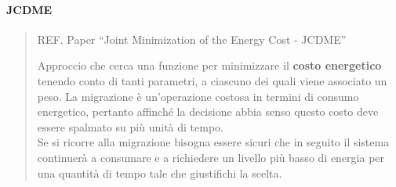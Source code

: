 \documentclass{article}
\begin{document}
		\paragraph{JCDME}
		\begin{quote}
		REF. Paper ``Joint Minimization of the Energy Cost -
		JCDME''
		
		Approccio che cerca una funzione per minimizzare il \textbf{costo energetico} tenendo conto di tanti parametri, a ciascuno dei quali viene associato un peso. La migrazione è un'operazione costosa in termini di consumo energetico, pertanto affinché la decisione abbia senso questo costo deve essere spalmato su più unità di tempo.\\
		Se si ricorre alla migrazione bisogna essere sicuri che in	seguito il sistema continuerà a consumare e a richiedere un livello più basso di energia per una quantità di tempo tale che giustifichi la scelta.
		\end{quote}
		
\end{document}

